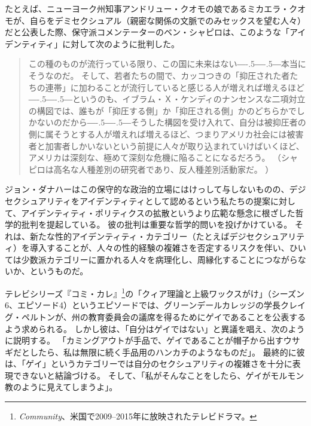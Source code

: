 \documentclass[paper=a4,book,openany]{jlreq}
\def\DDASH{―\kern-.5\zw―\kern-.5\zw―} %
\begin{document}
たとえば、ニューヨーク州知事アンドリュー・クオモの娘であるミカエラ・クオモが、自らをデミセクシュアル（親密な関係の文脈でのみセックスを望む人々）だと公表した際、保守派コメンテーターのベン・シャピロは、このような「アイデンティティ」に対して次のように批判した。

\begin{quote}
この種のものが流行っている限り、この国に未来はない{\DDASH}本当にそうなのだ。
そして、若者たちの間で、カッコつきの「抑圧された者たちの連帯」に加わることが流行していると感じる人が増えれば増えるほど{\DDASH}というのも、イブラム・Ｘ・ケンディのナンセンスな二項対立の構図では、誰もが「抑圧する側」か「抑圧される側」かのどちらかでしかないのだから{\DDASH}そうした構図を受け入れて、自分は被抑圧者の側に属そうとする人が増えれば増えるほど、つまりアメリカ社会には被害者と加害者しかいないという前提に人々が取り込まれていけばいくほど、アメリカは深刻な、極めて深刻な危機に陥ることになるだろう。
\citep{shapiro21:_andrew_cuomos_daugh_comes_out_demis} （シャピロは高名な人種差別の研究者であり、反人種差別活動家だ。
）

\end{quote}

ジョン・ダナハーはこの保守的な政治的立場にはけっして与しないものの、デジセクシュアリティをアイデンティティとして認めるという私たちの提案に対して、アイデンティティ・ポリティクスの拡散というより広範な懸念に根ざした哲学的批判を提起している。
彼の批判は重要な哲学的問いを投げかけている。
それは、新たな性的アイデンティティ・カテゴリー（たとえばデジセクシュアリティ）を導入することが、人々の性的経験の複雑さを否定するリスクを伴い、ひいては少数派カテゴリーに置かれる人々を病理化し、周縁化することにつながらないか、というものだ。

テレビシリーズ『コミ・カレ』\footnote{\emph{Community}、米国で2009--2015年に放映されたテレビドラマ。}の「クィア理論と上級ワックスがけ」（シーズン6、エピソード4）というエピソードでは、グリーンデールカレッジの学長クレイグ・ペルトンが、州の教育委員会の議席を得るためにゲイであることを公表するよう求められる。
しかし彼は、「自分はゲイではない」と異議を唱え、次のように説明する。
「カミングアウトが手品で、ゲイであることが帽子から出すウサギだとしたら、私は無限に続く手品用のハンカチのようなものだ」。
最終的に彼は、「ゲイ」というカテゴリーでは自分のセクシュアリティの複雑さを十分に表現できないと結論づける。
そして、「私がそんなことをしたら、ゲイがモルモン教のように見えてしまうよ」。
\end{document}
